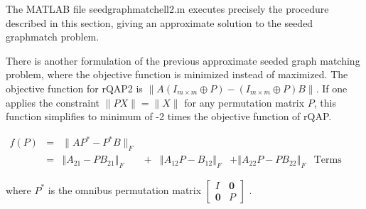 \documentclass[12pt]{article}
\begin{document}
The MATLAB file seedgraphmatchell2.m executes precisely the procedure
described in this section, giving an approximate solution to the
seeded graphmatch problem.


There is another formulation of  the previous approximate seeded graph matching problem, where the objective function is  minimized instead of maximized.
The objective function for rQAP2 is
$\|A(I_{m \times m}\oplus P)-(I_{m \times m}\oplus P)B\|$. If one applies the constraint $\|PX\|=\|X\|$ for any permutation matrix $P$, this function simplifies to minimum of -2 times the objective function of  rQAP.

\begin{align*}
f(P) & = & \lVert AP^{*}-P^{*}B\rVert _{F}\\
 & = & \left\Vert A_{21}-PB_{21}\right\Vert _{F} & + & \left\Vert A_{12}P-B_{12}\right\Vert _{F} & +\left\Vert A_{22}P-PB_{22}\right\Vert _{F} & \textrm{Terms (1), (2) and (3)}
\end{align*}


where $P^{*}$ is the omnibus permutation matrix $\left[\begin{array}{cc}
I & \mathbf{0}\\
\mathbf{0} & P
\end{array}\right]$ .
\end{document}
